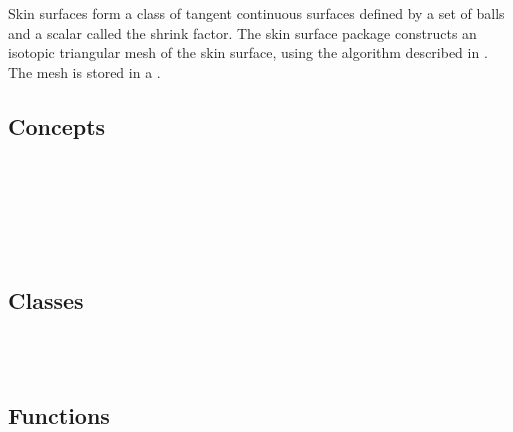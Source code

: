 
\label{chapterSkinSurfaceRef}

Skin surfaces form a class of tangent continuous surfaces defined by a
set of balls and a scalar called the shrink factor. The skin surface
package constructs an isotopic triangular mesh of the skin surface,
using the algorithm described in \cite{cgal:kv-mssct-05}. The mesh is
stored in a . 

\subsection*{Concepts}
\\
\\

\\
\\
\\


\subsection*{Classes}
\\
\\


\subsection*{Functions}
\\
\\


